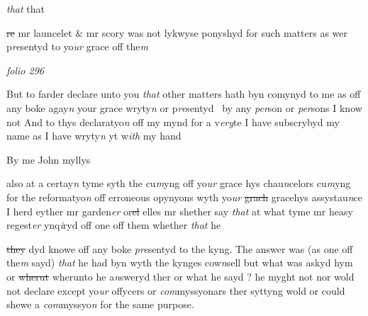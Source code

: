 \documentclass[12pt, a4paper]{book}
\begin{document}
               \textit{that}
               that 
			
               \sout{re}
mr launcelet \& mr scory was not lykwyse ponyshyd
for such matters as wer p\textit{re}sentyd to yo\textit{ur} grace off the\textit{m}
               
\dotfill
						\newpage
{}

\textit{folio 296}



		\ifthenelse{\isodd{\thepage}}
		{\reversemarginpar}
		{\normalmarginpar}
		But to farder declare unto you \textit{that} other matters hath byn
comynyd to me as 
			off any boke agay\textit{n} your grace  wryty\textit{n} or p\textit{re}sentyd 
by any \textit{per}son or \textit{per}sons I know not And to thys declaratyo\textit{n}
off my mynd for a v\textit{ery}te I have subscrybyd my name 
as I have wryty\textit{n} yt w\textit{ith} my hand


		\ifthenelse{\isodd{\thepage}}
		{\reversemarginpar}
		{\normalmarginpar}
		By me John myllys



		\ifthenelse{\isodd{\thepage}}
		{\reversemarginpar}
		{\normalmarginpar}
		also at a certay\textit{n} tyme syth the cu\textit{m}yng off yo\textit{ur} grace hys chau\textit{n}celors
cu\textit{m}yng for the reformatyo\textit{n} off erroneous opynyons wyth yo\textit{ur}
               \sout{grach}
gracehys assystau\textit{n}ce I herd eyther mr garden\textit{er} or\sout{el} elles mr
shether say \textit{that} at what tyme mr heasy regest\textit{er} ynq\textit{i}ryd off one off
them whether \textit{that}
               he \sout{}
			
               \sout{they }dyd knowe off any boke \textit{pre}sentyd to the
kyng. The answer was (as one off the\textit{m} sayd) \textit{that} he had byn wyth 
the kynges cow\textit{n}sell but what was askyd hym or \sout{wherut}
wherunto he a\textit{n}sweryd ther or what he sayd ? he myght not
nor wold not declare except yo\textit{ur} offycers or \textit{com}myssyonars
ther syttyng wold or could shewe a \textit{com}myssyo\textit{n} for the same
purpose.


\dotfill
						\newpage {} \section*{}  \subsection*{}
\end{document}
